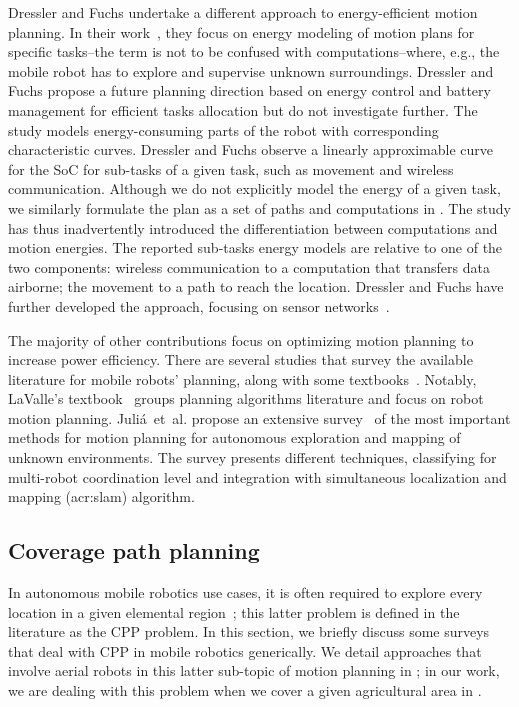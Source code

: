 Dressler and Fuchs undertake a different approach to energy-efficient motion planning. In their work~\citep{dressler2005energy}, they focus on energy modeling of motion plans for specific tasks--the term is not to be confused with computations--where, e.g., the mobile robot has to explore and supervise unknown surroundings. Dressler and Fuchs propose a future planning direction based on energy control and battery management for efficient tasks allocation but do not investigate further. The study models energy-consuming parts of the robot with corresponding characteristic curves. Dressler and Fuchs observe a linearly approximable curve for the SoC for sub-tasks of a given task, such as movement and wireless communication. Although we do not explicitly model the energy of a given task, we similarly formulate the plan as a set of paths and computations in . The study has thus inadvertently introduced the differentiation between computations and motion energies. The reported sub-tasks energy models are relative to one of the two components: wireless communication to a computation that transfers data airborne; the movement to a path to reach the location. Dressler and Fuchs have further developed the approach, focusing on sensor networks~\citep{fuchs2006distributed,dressler2006lifetime}.

The majority of other contributions focus on optimizing motion planning to increase power efficiency. There are several studies that survey the available literature for mobile robots' planning, along with some textbooks~\citep{choset2005principles,lavalle2006planning}. Notably, LaValle's textbook~\citep{lavalle2006planning} groups planning algorithms literature and focus on robot motion planning. Juli\'{a}~et~al. propose an extensive survey~\citep{julia2012comparison} of the most important methods for motion planning for autonomous exploration and mapping of unknown environments. The survey presents different techniques, classifying for multi-robot coordination level and integration with simultaneous localization and mapping (\Gls{acr:slam}) algorithm.

\subsection{Coverage path planning}
\label{sec:soa-cov-path-plan}

In autonomous mobile robotics use cases, it is often required to explore every location in a given elemental region~\citep{cao1988region}; this latter problem is defined in the literature as the CPP problem. In this section, we briefly discuss some surveys that deal with CPP in mobile robotics generically. We detail approaches that involve aerial robots in this latter sub-topic of motion planning in ; in our work, we are dealing with this problem when we cover a given agricultural area in .

